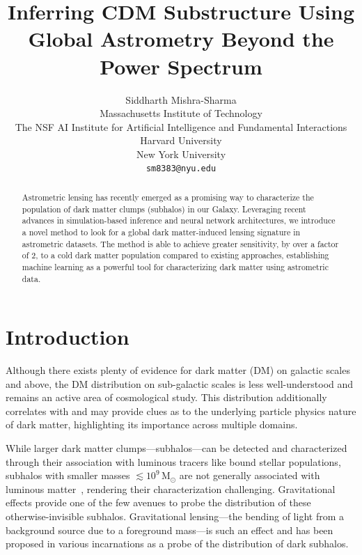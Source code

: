 \documentclass[]{article}
\title{Inferring CDM Substructure Using \\ Global Astrometry Beyond the Power Spectrum}
\author{
Siddharth Mishra-Sharma \\
Massachusetts Institute of Technology \\
The NSF AI Institute for Artificial Intelligence and Fundamental Interactions \\
Harvard University \\ 
New York University \\
\texttt{sm8383@nyu.edu} \\
}
\begin{document}
\maketitle

\begin{abstract}
Astrometric lensing has recently emerged as a promising way to characterize the population of dark matter clumps (subhalos) in our Galaxy. Leveraging recent advances in simulation-based inference and neural network architectures, we introduce a novel method to look for a global dark matter-induced lensing signature in astrometric datasets. The method is able to achieve greater sensitivity, by over a factor of 2, to a cold dark matter population compared to existing approaches, establishing machine learning as a powerful tool for characterizing dark matter using astrometric data. 
\end{abstract}

\section{Introduction}
\label{sec:intro}

Although there exists plenty of evidence for dark matter (DM) on galactic scales and above,
the DM distribution on sub-galactic scales is less well-understood and remains an active area of cosmological study. This distribution additionally correlates with and may provide clues as to the underlying particle physics nature of dark matter, highlighting its importance across multiple domains. 

While larger dark matter clumps---subhalos---can be detected and characterized through their association with luminous tracers like bound stellar populations, subhalos with smaller masses $\lesssim 10^9\,\mathrm M_\odot$ are not generally associated with luminous matter~\cite{Fitts:2016usl,2017MNRAS.467.2019R}, rendering their characterization challenging. Gravitational effects provide one of the few avenues to probe the distribution of these otherwise-invisible subhalos. Gravitational lensing---the bending of light from a background source due to a foreground mass---is such an effect and has been proposed in various incarnations as a probe of the distribution of dark subhalos. 
\end{document}
